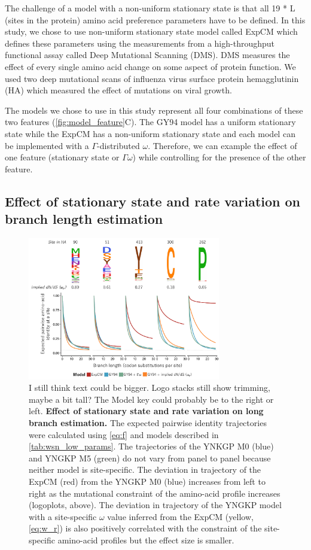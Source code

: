 \documentclass[11pt]{article}
\newcommand\jdbcomment[1]{{\color{red}#1}}
\begin{document}
The challenge of a model with a non-uniform stationary state is that all 19 * L (sites in the protein) amino acid preference parameters have to be defined. 
In this study, we chose to use non-uniform stationary state model called ExpCM which defines these parameters using the measurements from a high-throughput functional assay called Deep Mutational Scanning (DMS). 
DMS measures the effect of every single amino acid change on some aspect of protein function. 
We used two deep mutational scans of influenza virus surface protein hemagglutinin (HA) which measured the effect of mutations on viral growth. 

The models we chose to use in this study represent all four combinations of these two features (\ref{fig:model_feature}C). 
The GY94 model has a uniform stationary state while the ExpCM has a non-uniform stationary state and each model can be implemented with a $\Gamma$-distributed $\omega$. 
Therefore, we can example the effect of one feature (stationary state or $\Gamma\omega$) while controlling for the presence of the other feature. 

\subsection*{Effect of stationary state and rate variation on branch length estimation}

\begin{figure}[H]
\centerline{\includegraphics[width=0.75\textwidth]{figures/decay.pdf}}
\caption{\label{fig:decay}
\jdbcomment{I still think text could be bigger. Logo stacks still show trimming, maybe a bit tall? The Model key could probably be to the right or left.}
\textbf{Effect of stationary state and rate variation on long branch estimation.}
The expected pairwise identity trajectories were calculated using \ref{eq:f} and models described in \ref{tab:wsn_low_params}.
The trajectories of the YNKGP M0 (blue) and YNGKP M5 (green) do not vary from panel to panel because neither model is site-specific. 
The deviation in trajectory of the ExpCM (red) from the YNGKP M0 (blue) increases from left to right as the mutational constraint of the amino-acid profile increases (logoplots, above). 
The deviation in trajectory of the YNGKP model with a site-specific $\omega$ value inferred from the ExpCM (yellow, \ref{eq:w_r}) is also positively correlated with the constraint of the site-specific amino-acid profiles but the effect size is smaller. 
}
\end{figure}
\end{document}
